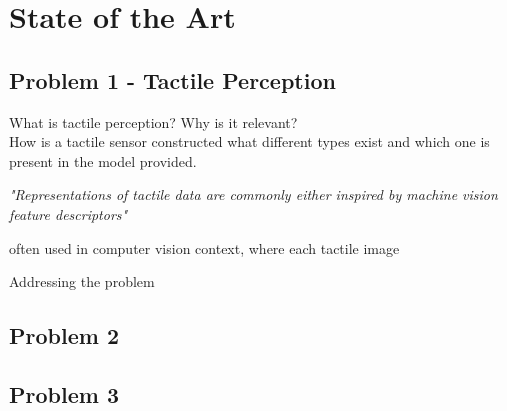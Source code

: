 
\chapter{State of the Art} \label{ch:state-of-the-art}

\section{Problem 1 - Tactile Perception} \label{sec:lit-rev-problem-1}

What is tactile perception? Why is it relevant? \\
How is a tactile sensor constructed \cite{recent-progress-in-technologies-for-tactile-sensors}
what different types exist and which one is present in the model provided.


\textit{"Representations of tactile data are commonly either inspired by machine vision feature descriptors"}

often used in computer vision context, where each tactile image 

Addressing the problem 





\section{Problem 2} \label{sec:lit-rev-problem-2}

\section{Problem 3} \label{sec:lit-rev-problem-3}